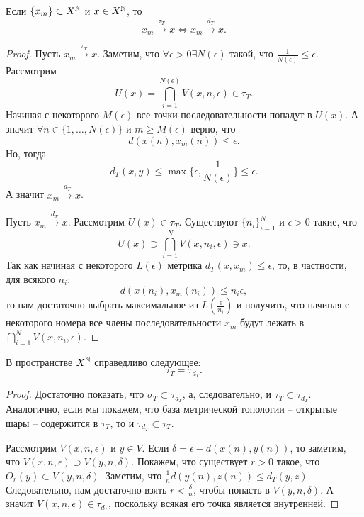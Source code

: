 \begin{example}
    \begin{proposition}
        Если $\{x_m\} \subset X^{\mathbb{N}}$ и $x \in X^{\mathbb{N}}$, то
        \[
            x_m \xrightarrow{\tau_T} x \Longleftrightarrow x_m \xrightarrow{d_T} x.
        \]
    \end{proposition}
    \begin{proof}
        Пусть $x_m \xrightarrow{\tau_T} x$.
        Заметим, что $\forall \epsilon > 0 \exists N(\epsilon)$ такой, что $\frac{1}{N(\epsilon)} \leq \epsilon$.
        Рассмотрим
        \[
            U(x) = \bigcap_{i = 1}^{N(\epsilon)} V(x, n, \epsilon) \in \tau_T.
        \]
        Начиная с некоторого $M(\epsilon)$ все точки последовательности попадут в $U(x)$.
        А значит $\forall n \in \{1, \ldots, N(\epsilon)\}$ и $m \geq M(\epsilon)$ верно, что
        \[
            d(x(n), x_m(n)) \leq \epsilon.
        \]
        Но, тогда
        \[
            d_T(x, y) \leq \max\{\epsilon, \frac{1}{N(\epsilon)}\} \leq \epsilon.
        \]
        А значит $x_m \xrightarrow{d_T} x$.

        Пусть $x_m \xrightarrow{d_T} x$.
        Рассмотрим $U(x) \in \tau_T$.
        Существуют $\{n_i\}_{i = 1}^{N}$ и $\epsilon > 0$ такие, что
        \[
            U(x) \supset \bigcap_{i = 1}^{N} V(x, n_i, \epsilon) \ni x.
        \]
        Так как начиная с некоторого $L(\epsilon)$ метрика $d_T(x, x_m) \leq \epsilon$, то, в частности, для всякого $n_i$:
        \[
            d(x(n_i), x_m(n_i)) \leq n_i\epsilon,
        \]
        то нам достаточно выбрать максимальное из $L\left(\frac{\epsilon}{n_i}\right)$ и получить, что начиная с некоторого номера все члены последовательности $x_m$ будут лежать в $\bigcap_{i = 1}^{N} V(x, n_i, \epsilon)$.
    \end{proof}

    \begin{proposition}
        В пространстве $X^{\mathbb{N}}$ справедливо следующее:
        \[
            \tau_T = \tau_{d_T}.
        \]
    \end{proposition}
    \begin{proof}
        Достаточно показать, что $\sigma_T \subset \tau_{d_T}$, а, следовательно, и $\tau_{T} \subset \tau_{d_T}$.
        Аналогично, если мы покажем, что база метрической топологии -- открытые шары -- содержится в $\tau_{T}$, то и $\tau_{d_T} \subset \tau_T$.

        Рассмотрим $V(x, n, \epsilon)$ и $y \in V$.
        Если $\delta = \epsilon - d(x(n), y(n))$, то заметим, что $V(x, n, \epsilon) \supset V(y, n, \delta)$.
        Покажем, что существует $r > 0$ такое, что $O_r(y) \subset V(y, n, \delta)$.
        Заметим, что $\frac{1}{n}d(y(n), z(n)) \leq d_T(y, z)$.
        Следовательно, нам достаточно взять $r < \frac{\delta}{n}$, чтобы попасть в $V(y, n, \delta)$.
        А значит $V(x, n, \epsilon) \in \tau_{d_T}$, поскольку всякая его точка является внутренней.


\end{proof}
\end{example}
